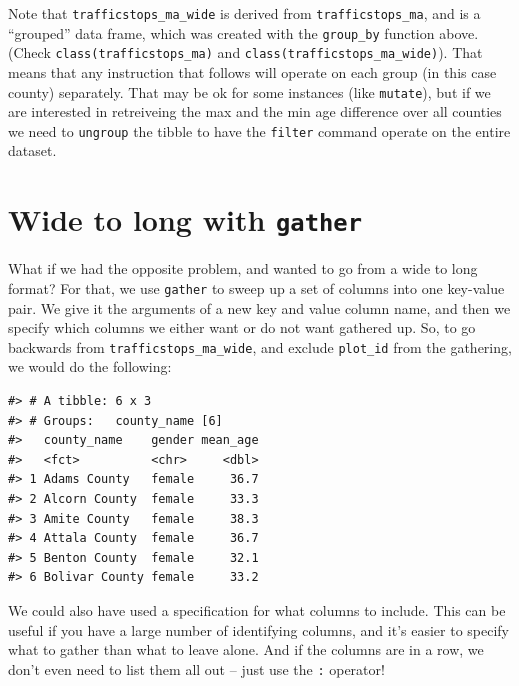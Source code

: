 \documentclass[]{book}
\newenvironment{Shaded}{\begin{snugshade}}{\end{snugshade}}
\newcommand{\KeywordTok}[1]{\textcolor[rgb]{0.13,0.29,0.53}{\textbf{#1}}}
\newcommand{\NormalTok}[1]{#1}
\newcommand{\OperatorTok}[1]{\textcolor[rgb]{0.81,0.36,0.00}{\textbf{#1}}}
\newcommand{\StringTok}[1]{\textcolor[rgb]{0.31,0.60,0.02}{#1}}
\begin{document}
Note that \texttt{trafficstops\_ma\_wide} is derived from \texttt{trafficstops\_ma}, and is a ``grouped'' data frame, which was created with the \texttt{group\_by} function above. (Check \texttt{class(trafficstops\_ma)} and \texttt{class(trafficstops\_ma\_wide)}). That means that any instruction that follows will operate on each group (in this case county) separately. That may be ok for some instances (like \texttt{mutate}), but if we are interested in retreiveing the max and the min age difference over all counties we need to \texttt{ungroup} the tibble to have the \texttt{filter} command operate on the entire dataset.

\hypertarget{wide-to-long-with-gather}{%
\section{\texorpdfstring{Wide to long with \texttt{gather}}{Wide to long with gather}}\label{wide-to-long-with-gather}}

What if we had the opposite problem, and wanted to go from a wide to long
format? For that, we use \texttt{gather} to sweep up a set of columns into one
key-value pair. We give it the arguments of a new key and value column name, and
then we specify which columns we either want or do not want gathered up. So, to
go backwards from \texttt{trafficstops\_ma\_wide}, and exclude \texttt{plot\_id} from the gathering,
we would do the following:

\begin{Shaded}
\end{Shaded}

\begin{verbatim}
#> # A tibble: 6 x 3
#> # Groups:   county_name [6]
#>   county_name    gender mean_age
#>   <fct>          <chr>     <dbl>
#> 1 Adams County   female     36.7
#> 2 Alcorn County  female     33.3
#> 3 Amite County   female     38.3
#> 4 Attala County  female     36.7
#> 5 Benton County  female     32.1
#> 6 Bolivar County female     33.2
\end{verbatim}

We could also have used a specification for what columns to include. This can be
useful if you have a large number of identifying columns, and it's easier to
specify what to gather than what to leave alone. And if the columns are in a
row, we don't even need to list them all out -- just use the \texttt{:} operator!
\end{document}
